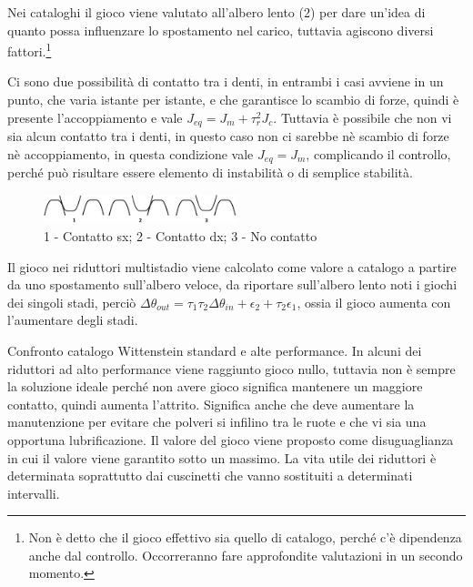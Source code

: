 Nei cataloghi il gioco viene valutato all'albero lento (2) per dare un'idea di quanto possa influenzare lo spostamento nel carico, tuttavia agiscono diversi fattori.\footnote{Non è detto che il gioco effettivo sia quello di catalogo, perché c'è dipendenza anche dal controllo. Occorreranno fare approfondite valutazioni in un secondo momento.}

Ci sono due possibilità di contatto tra i denti, in entrambi i casi avviene in un punto, che varia istante per istante, e che garantisce lo scambio di forze, quindi è presente l'accoppiamento e vale $J_{eq}=J_m+\tau_r^2 J_c$. 
Tuttavia è possibile che non vi sia alcun contatto tra i denti, in questo caso non ci sarebbe nè scambio di forze nè accoppiamento, in questa condizione vale $J_{eq}=J_m$, complicando il controllo, perché può risultare essere elemento di instabilità o di semplice stabilità.

\begin{figure}[h]
    \centering
    \includegraphics[width=0.5\textwidth]{Immagini/config_denti_gioco.png}
    \caption{1 - Contatto sx; 2 - Contatto dx; 3 - No contatto}
\end{figure}

Il gioco nei riduttori multistadio viene calcolato come valore a catalogo a partire da uno spostamento sull'albero veloce, da riportare sull'albero lento noti i giochi dei singoli stadi, perciò \( \Delta \theta_{out} = \tau_1\tau_2\Delta \theta_{in} + \epsilon_2 +\tau_2\epsilon_1 \), ossia il gioco aumenta con l'aumentare degli stadi.

Confronto catalogo Wittenstein standard e alte performance. In alcuni dei riduttori ad alto performance viene raggiunto gioco nullo, tuttavia non è sempre la soluzione ideale perché non avere gioco significa mantenere un maggiore contatto, quindi aumenta l'attrito. Significa anche che deve aumentare la manutenzione per evitare che polveri si infilino tra le ruote e che vi sia una opportuna lubrificazione. 
Il valore del gioco viene proposto come disuguaglianza in cui il valore viene garantito sotto un massimo.
La vita utile dei riduttori è determinata soprattutto dai cuscinetti che vanno sostituiti a determinati intervalli.

